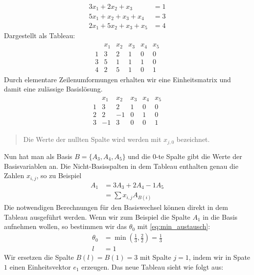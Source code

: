 \begin{example}
\begin{align*}
3x_1 + 2x_2 + x_3 &= 1\\
5x_1 + x_2 + x_3 + x_4 &= 3\\
2x_1 + 5x_2 + x_3 + x_5 &= 4
\end{align*}
Dargestellt als Tableau:
\begin{align*}
\begin{matrix}
 & x_1 & x_2 & x_3 & x_4 & x_5 \\
1 & 3 & 2 & 1 & 0 & 0\\
3 & 5 & 1 & 1 & 1 & 0\\
4 & 2 & 5 & 1 & 0 & 1
\end{matrix}
\end{align*}
Durch elementare Zeilenumformungen erhalten wir eine Einheitsmatrix und damit eine zulässige Basislösung.
\begin{align*}
\begin{matrix}
 & x_1 & x_2 & x_3 & x_4 & x_5 \\
1 & 3 & 2 & 1 & 0 & 0\\
2 & 2 & -1 & 0 & 1 & 0\\
3 & -1 & 3 & 0 & 0 & 1
\end{matrix}
\end{align*}
\begin{quotation}
Die Werte der nullten Spalte wird werden mit $x_{j,0}$ bezeichnet.
\end{quotation}
Nun hat man als Basis $B = \{A_3, A_4, A_5\}$ und die $0$-te Spalte gibt die Werte der Basisvariablen an. Die Nicht-Basisspalten in dem Tableau enthalten genau die Zahlen $x_{i,j}$, so zu Beispiel
\begin{align*}
A_1 &= 3A_3 + 2 A_4 - 1 A_5\\
 &=\sum x_{i,j} A_{B(i)}
\end{align*}
Die notwendigen Berechnungen für den Basiswechsel können direkt in dem Tableau ausgeführt werden. Wenn wir zum Beispiel die Spalte $A_1$ in die Basis aufnehmen wollen, so bestimmen wir das $\theta_0$ mit \eqref{eq:min_austausch}:
\begin{align*}
\theta_0 &= \min \left ( \frac{1}{3}, \frac{2}{2} \right ) = \frac{1}{3} \\
l&= 1
\end{align*}
Wir ersetzen die Spalte $B(l) = B(1) = 3$ mit Spalte $j=1$, indem wir in Spate $1$ einen Einheitsvektor $e_1$ erzeugen. Das neue Tableau sieht wie folgt aus:
\begin{align*}
\begin{matrix}

\end{matrix}
\end{align*}
\end{example}
